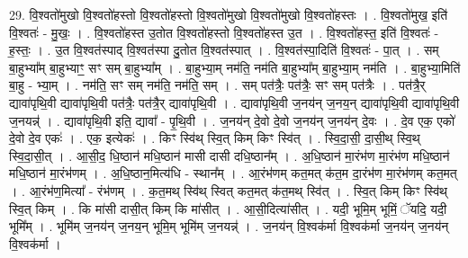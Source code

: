 \documentclass[17pt]{extarticle}
\begin{document}
29. वि॒श्वतो॑मुखो वि॒श्वतो॑हस्तो वि॒श्वतो॑हस्तो वि॒श्वतो॑मुखो वि॒श्वतो॑मुखो वि॒श्वतो॑हस्तः । . वि॒श्वतो॑मुख॒ इति॑ वि॒श्वतः॑ - मु॒खः॒ । . वि॒श्वतो॑हस्त उ॒तोत वि॒श्वतो॑हस्तो वि॒श्वतो॑हस्त उ॒त । . वि॒श्वतो॑हस्त॒ इति॑ वि॒श्वतः॑ - ह॒स्तः॒ । . उ॒त वि॒श्वत॑स्पाद् वि॒श्वत॑स्पा दु॒तोत वि॒श्वत॑स्पात् । . वि॒श्वत॑स्पा॒दिति॑ वि॒श्वतः॑ - पा॒त् । . सम् बा॒हुभ्या᳚म् बा॒हुभ्याꣳ॒॒ सꣳ सम् बा॒हुभ्या᳚म् । . बा॒हुभ्या॒म् नम॑ति॒ नम॑ति बा॒हुभ्या᳚म् बा॒हुभ्या॒म् नम॑ति । . बा॒हुभ्या॒मिति॑ बा॒हु - भ्या॒म् । . नम॑ति॒ सꣳ सम् नम॑ति॒ नम॑ति॒ सम् । . सम् पत॑त्रैः॒ पत॑त्रैः॒ सꣳ सम् पत॑त्रैः । . पत॑त्रै॒र् द्यावा॑पृथि॒वी द्यावा॑पृथि॒वी पत॑त्रैः॒ पत॑त्रै॒र् द्यावा॑पृथि॒वी । . द्यावा॑पृथि॒वी ज॒नय॑न् ज॒नय॒न् द्यावा॑पृथि॒वी द्यावा॑पृथि॒वी ज॒नयन्न्॑ । . द्यावा॑पृथि॒वी इति॒ द्यावा᳚ - पृ॒थि॒वी । . ज॒नय॑न् दे॒वो दे॒वो ज॒नय॑न् ज॒नय॑न् दे॒वः । . दे॒व एक॒ एको॑ दे॒वो दे॒व एकः॑ । . एक॒ इत्येकः॑ । . किꣳ स्वि॑थ् स्वि॒त् किम् किꣳ स्वि॑त् । . स्वि॒दा॒सी॒ दा॒सी॒थ् स्वि॒थ् स्वि॒दा॒सी॒त् । . आ॒सी॒द॒ धि॒ष्ठान॑ मधि॒ष्ठान॑ मासी दासी दधि॒ष्ठान᳚म् । . अ॒धि॒ष्ठान॑ मा॒रंभ॑ण मा॒रंभ॑ण मधि॒ष्ठान॑ मधि॒ष्ठान॑ मा॒रंभ॑णम् । . अ॒धि॒ष्ठान॒मित्य॑धि - स्थान᳚म् । . आ॒रंभ॑णम् कत॒मत् क॑त॒म दा॒रंभ॑ण मा॒रंभ॑णम् कत॒मत् । . आ॒रंभ॑ण॒मित्या᳚ - रंभ॑णम् । . क॒त॒मथ् स्वि॑थ् स्वित् कत॒मत् क॑त॒मथ् स्वि॑त् । . स्वि॒त् किम् किꣳ स्वि॑थ् स्वि॒त् किम् । . कि मा॑सी दासी॒त् किम् कि मा॑सीत् । . आ॒सी॒दित्या॑सीत् । . यदी॒ भूमि॒म् भूमिं॒ ॅयदि॒ यदी॒ भूमि᳚म् । . भूमि॑म् ज॒नय॑न् ज॒नय॒न् भूमि॒म् भूमि॑म् ज॒नयन्न्॑ । . ज॒नय॑न् वि॒श्वक॑र्मा वि॒श्वक॑र्मा ज॒नय॑न् ज॒नय॑न् वि॒श्वक॑र्मा । \newline
\end{document}
